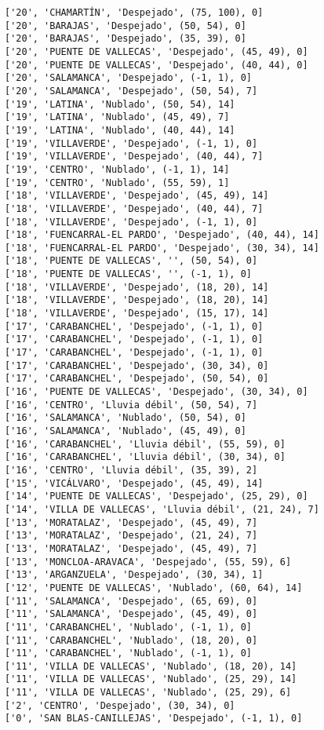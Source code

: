 \documentclass[11pt]{article}
\begin{document}
\begin{Verbatim}[commandchars=\\\{\}]
['20', 'CHAMARTÍN', 'Despejado', (75, 100), 0]
['20', 'BARAJAS', 'Despejado', (50, 54), 0]
['20', 'BARAJAS', 'Despejado', (35, 39), 0]
['20', 'PUENTE DE VALLECAS', 'Despejado', (45, 49), 0]
['20', 'PUENTE DE VALLECAS', 'Despejado', (40, 44), 0]
['20', 'SALAMANCA', 'Despejado', (-1, 1), 0]
['20', 'SALAMANCA', 'Despejado', (50, 54), 7]
['19', 'LATINA', 'Nublado', (50, 54), 14]
['19', 'LATINA', 'Nublado', (45, 49), 7]
['19', 'LATINA', 'Nublado', (40, 44), 14]
['19', 'VILLAVERDE', 'Despejado', (-1, 1), 0]
['19', 'VILLAVERDE', 'Despejado', (40, 44), 7]
['19', 'CENTRO', 'Nublado', (-1, 1), 14]
['19', 'CENTRO', 'Nublado', (55, 59), 1]
['18', 'VILLAVERDE', 'Despejado', (45, 49), 14]
['18', 'VILLAVERDE', 'Despejado', (40, 44), 7]
['18', 'VILLAVERDE', 'Despejado', (-1, 1), 0]
['18', 'FUENCARRAL-EL PARDO', 'Despejado', (40, 44), 14]
['18', 'FUENCARRAL-EL PARDO', 'Despejado', (30, 34), 14]
['18', 'PUENTE DE VALLECAS', '', (50, 54), 0]
['18', 'PUENTE DE VALLECAS', '', (-1, 1), 0]
['18', 'VILLAVERDE', 'Despejado', (18, 20), 14]
['18', 'VILLAVERDE', 'Despejado', (18, 20), 14]
['18', 'VILLAVERDE', 'Despejado', (15, 17), 14]
['17', 'CARABANCHEL', 'Despejado', (-1, 1), 0]
['17', 'CARABANCHEL', 'Despejado', (-1, 1), 0]
['17', 'CARABANCHEL', 'Despejado', (-1, 1), 0]
['17', 'CARABANCHEL', 'Despejado', (30, 34), 0]
['17', 'CARABANCHEL', 'Despejado', (50, 54), 0]
['16', 'PUENTE DE VALLECAS', 'Despejado', (30, 34), 0]
['16', 'CENTRO', 'Lluvia débil', (50, 54), 7]
['16', 'SALAMANCA', 'Nublado', (50, 54), 0]
['16', 'SALAMANCA', 'Nublado', (45, 49), 0]
['16', 'CARABANCHEL', 'Lluvia débil', (55, 59), 0]
['16', 'CARABANCHEL', 'Lluvia débil', (30, 34), 0]
['16', 'CENTRO', 'Lluvia débil', (35, 39), 2]
['15', 'VICÁLVARO', 'Despejado', (45, 49), 14]
['14', 'PUENTE DE VALLECAS', 'Despejado', (25, 29), 0]
['14', 'VILLA DE VALLECAS', 'Lluvia débil', (21, 24), 7]
['13', 'MORATALAZ', 'Despejado', (45, 49), 7]
['13', 'MORATALAZ', 'Despejado', (21, 24), 7]
['13', 'MORATALAZ', 'Despejado', (45, 49), 7]
['13', 'MONCLOA-ARAVACA', 'Despejado', (55, 59), 6]
['13', 'ARGANZUELA', 'Despejado', (30, 34), 1]
['12', 'PUENTE DE VALLECAS', 'Nublado', (60, 64), 14]
['11', 'SALAMANCA', 'Despejado', (65, 69), 0]
['11', 'SALAMANCA', 'Despejado', (45, 49), 0]
['11', 'CARABANCHEL', 'Nublado', (-1, 1), 0]
['11', 'CARABANCHEL', 'Nublado', (18, 20), 0]
['11', 'CARABANCHEL', 'Nublado', (-1, 1), 0]
['11', 'VILLA DE VALLECAS', 'Nublado', (18, 20), 14]
['11', 'VILLA DE VALLECAS', 'Nublado', (25, 29), 14]
['11', 'VILLA DE VALLECAS', 'Nublado', (25, 29), 6]
['2', 'CENTRO', 'Despejado', (30, 34), 0]
['0', 'SAN BLAS-CANILLEJAS', 'Despejado', (-1, 1), 0]

\end{Verbatim}
\end{document}
